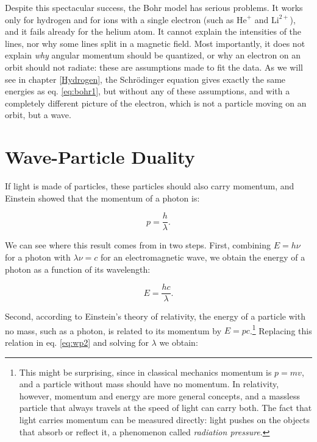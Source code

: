 \documentclass[
  english,
  9pt,
]{extbook}
\theoremstyle{definition}
\theoremstyle{definition}
\theoremstyle{definition}
\theoremstyle{definition}
\theoremstyle{remark}
\begin{document}
Despite this spectacular success, the Bohr model has serious problems. It works only for hydrogen and for ions with a single electron (such as \(\mathrm{He}^+\) and \(\mathrm{Li}^{2+}\)), and it fails already for the helium atom. It cannot explain the intensities of the lines, nor why some lines split in a magnetic field. Most importantly, it does not explain \emph{why} angular momentum should be quantized, or why an electron on an orbit should not radiate: these are assumptions made to fit the data. As we will see in chapter \ref{Hydrogen}, the Schrödinger equation gives exactly the same energies as eq. \eqref{eq:bohr1}, but without any of these assumptions, and with a completely different picture of the electron, which is not a particle moving on an orbit, but a wave.

\section{Wave-Particle Duality}\label{wave-particle-duality}

If light is made of particles, these particles should also carry momentum, and Einstein showed that the momentum of a photon is:

\begin{equation}
p = \frac{h}{\lambda}.
\label{eq:wp1}
\end{equation}

We can see where this result comes from in two steps. First, combining \(E = h \nu\) for a photon with \(\lambda \nu = c\) for an electromagnetic wave, we obtain the energy of a photon as a function of its wavelength:

\begin{equation}
E = \frac{h c}{\lambda}.
\label{eq:wp2}
\end{equation}

Second, according to Einstein's theory of relativity, the energy of a particle with no mass, such as a photon, is related to its momentum by \(E = pc\).\footnote{This might be surprising, since in classical mechanics momentum is \(p=mv\), and a particle without mass should have no momentum. In relativity, however, momentum and energy are more general concepts, and a massless particle that always travels at the speed of light can carry both. The fact that light carries momentum can be measured directly: light pushes on the objects that absorb or reflect it, a phenomenon called \emph{radiation pressure}.} Replacing this relation in eq. \eqref{eq:wp2} and solving for \(\lambda\) we obtain:
\end{document}
